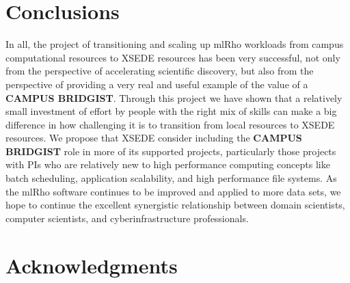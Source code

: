 \documentclass{sig-alternate}
\begin{document}
\section{Conclusions}\label{sec:conclusion}

In all, the project of transitioning and scaling up mlRho workloads from campus computational resources
to XSEDE resources has been very successful, not only from the perspective of accelerating scientific
discovery, but also from the perspective of providing a very real and useful example of the value of a {\bf
  CAMPUS BRIDGIST}. Through this project we have shown that a relatively small investment of effort by people
with the right mix of skills can make a big difference in how challenging it is to transition from local
resources to XSEDE resources. We propose that XSEDE consider including the {\bf CAMPUS BRIDGIST} role in more
of its supported projects, particularly those projects with PIs who are relatively new to high performance
computing concepts like batch scheduling, application scalability, and high performance file systems. As the
mlRho software continues to be improved and applied to more data sets, we hope to continue the excellent
synergistic relationship between domain scientists, computer scientists, and cyberinfrastructure
professionals.


\section{Acknowledgments}
%

%
%
\end{document}
